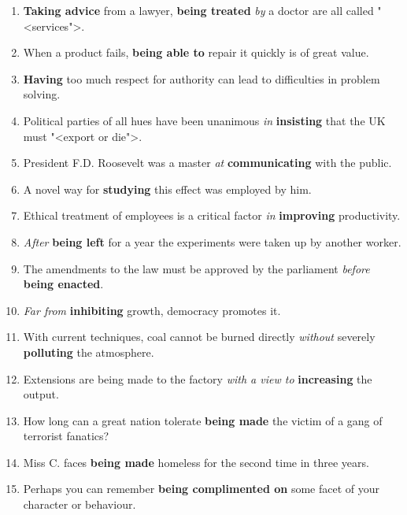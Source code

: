 \documentclass[main.tex]{subfiles}
\begin{document}
\newpage
\setcounter{subsection}{11}


\newpage
\setcounter{subsection}{12}

\newpage
\setcounter{subsection}{13}



\begin{enumerate}[nosep,leftmargin=*]
	\itemsep\eitsp
	\item \textbf{Taking advice} from a lawyer, \textbf{being treated} \textit{by} a doctor are all called "<services">.
	\item When a product fails, \textbf{being able to} repair it quickly is of great value.
	\item \textbf{Having} too much respect for authority can lead to difficulties in problem solving.
	\item Political parties of all hues have been unanimous \textit{in} \textbf{insisting} that the UK must "<export or die">.
	\item President F.D. Roosevelt was a master \textit{at} \textbf{communicating} with the public.
	\item A novel way for \textbf{studying} this effect was employed by him.
	\item Ethical treatment of employees is a critical factor \textit{in} \textbf{improving} productivity.
	\item \textit{After} \textbf{being left} for a year the experiments were taken up by another worker.
	\item The amendments to the law must be approved by the parliament \textit{before} \textbf{being enacted}.
	\item \textit{Far from} \textbf{inhibiting} growth, democracy promotes it.
	\item With current techniques, coal cannot be burned directly \textit{without} severely \textbf{polluting} the atmosphere.
	\item Extensions are being made to the factory \textit{with a view to} \textbf{increasing} the output.
	\item How long can a great nation tolerate \textbf{being made} the victim of a gang of terrorist fanatics?
	\item Miss C. faces \textbf{being made} homeless for the second time in three years.
	\item Perhaps you can remember \textbf{being complimented on} some facet of your character or behaviour.
\end{enumerate}
\ 
\end{document}
